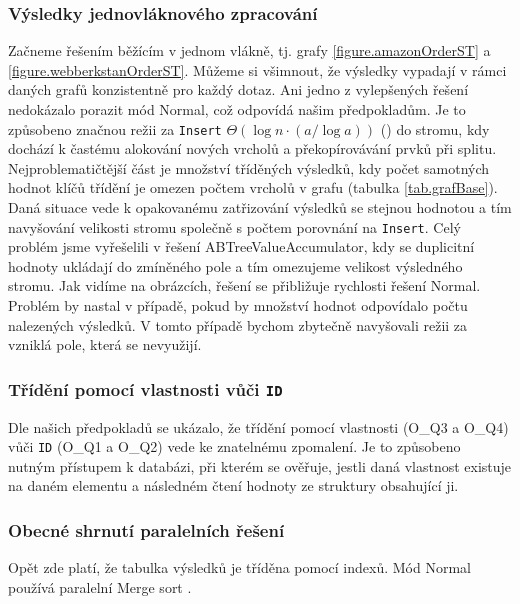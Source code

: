 \subsubsection{Výsledky jednovláknového zpracování}

Začneme řešením běžícím v jednom vlákně, tj. grafy  \ref{figure.amazonOrderST} a \ref{figure.webberkstanOrderST}.
Můžeme si všimnout, že výsledky vypadají v rámci daných grafů konzistentně pro každý dotaz.
Ani jedno z vylepšených řešení nedokázalo porazit mód Normal, což odpovídá našim předpokladům. 
Je to způsobeno značnou režii za \verb+Insert+ $\Theta(\log n \cdot (a/\log a))$ (\citet[03. (a, b)-trees str. 6]{dataLecture}) do stromu, kdy dochází k častému alokování nových vrcholů a překopírovávání prvků při splitu.
Nejproblematičtější část je množství tříděných výsledků, kdy počet samotných hodnot klíčů třídění je omezen počtem vrcholů v grafu (tabulka \ref{tab.grafBase}). 
Daná situace vede k opakovanému zatřizování výsledků se stejnou hodnotou a tím navyšování velikosti stromu společně s počtem porovnání na \verb+Insert+.
Celý problém jsme vyřešelili v řešení ABTreeValueAccumulator, kdy se duplicitní hodnoty ukládají do zmíněného pole a tím omezujeme velikost výsledného stromu. 
Jak vidíme na obrázcích, řešení se přibližuje rychlosti řešení Normal.
Problém by nastal v případě, pokud by množství hodnot odpovídalo počtu nalezených výsledků. 
V tomto případě bychom zbytečně navyšovali režii za vzniklá pole, která se nevyužijí.

\subsubsection{Třídění pomocí vlastnosti vůči \texttt{ID}}

Dle našich předpokladů se ukázalo, že třídění pomocí vlastnosti (O\_Q3 a O\_Q4) vůči \verb+ID+ (O\_Q1 a O\_Q2) vede ke znatelnému zpomalení.
Je to způsobeno nutným přístupem k databázi, při kterém se ověřuje, jestli daná vlastnost existuje na daném elementu a následném čtení hodnoty ze struktury obsahující ji.

\subsubsection{Obecné shrnutí paralelních řešení}

Opět zde platí, že tabulka výsledků je tříděna pomocí indexů.
Mód Normal používá paralelní Merge sort \citep{hpcsharp}.

